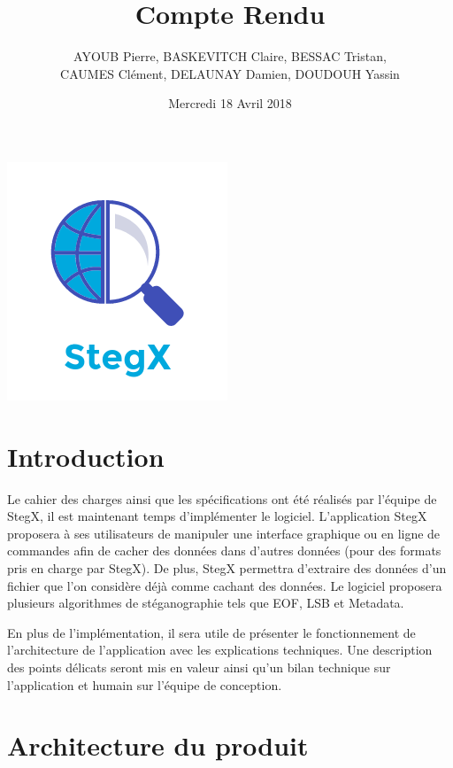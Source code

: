 \documentclass[11pt]{article}
\title{\huge{\textbf Compte Rendu}}
\author{AYOUB Pierre, BASKEVITCH Claire, BESSAC Tristan, \\
CAUMES Clément, DELAUNAY Damien, DOUDOUH Yassin}
\date{Mercredi 18 Avril 2018}
\begin{document}
\maketitle
\vspace{20em}
\begin{center}\includegraphics{pictures/Application.png}\end{center}
\newpage

\tableofcontents

\newpage

\section{Introduction}

Le cahier des charges ainsi que les spécifications ont été réalisés par 
l'équipe de StegX, il est maintenant temps d'implémenter le logiciel.
L'application StegX proposera à ses utilisateurs de manipuler une interface 
graphique ou en ligne de commandes afin de cacher des données dans d'autres 
données (pour des formats pris en charge par StegX). De plus, StegX permettra 
d'extraire des données d'un fichier que l'on considère déjà comme cachant 
des données. Le logiciel proposera plusieurs algorithmes de stéganographie
tels que EOF, LSB et Metadata. 

En plus de l'implémentation, il sera utile de présenter le fonctionnement 
de l'architecture de l'application avec les explications techniques. 
Une description des points délicats seront mis en valeur ainsi qu'un 
bilan technique sur l'application et humain sur l'équipe de conception. 

\section{Architecture du produit}
\end{document}
